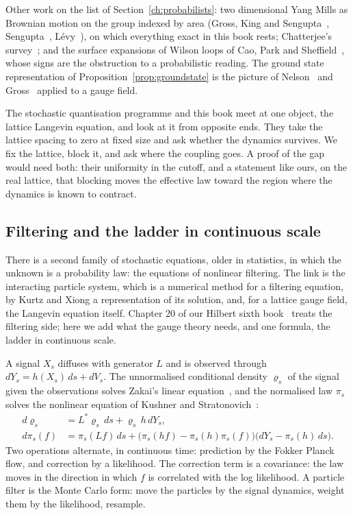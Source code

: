 Other work on the list of Section~\ref{ch:probabilists}: two dimensional Yang Mills as Brownian motion on the group indexed by area (Gross, King and Sengupta~\cite{GKS89}, Sengupta~\cite{Se97}, L\'evy~\cite{Le03}), on which everything exact in this book rests; Chatterjee's survey~\cite{Ch19}; and the surface expansions of Wilson loops of Cao, Park and Sheffield~\cite{CPS25}, whose signs are the obstruction to a probabilistic reading. The ground state representation of Proposition~\ref{prop:groundstate} is the picture of Nelson~\cite{Ne73} and Gross~\cite{Gro75} applied to a gauge field.

The stochastic quantisation programme and this book meet at one object, the lattice Langevin equation, and look at it from opposite ends. They take the lattice spacing to zero at fixed size and ask whether the dynamics survives. We fix the lattice, block it, and ask where the coupling goes. A proof of the gap would need both: their uniformity in the cutoff, and a statement like ours, on the real lattice, that blocking moves the effective law toward the region where the dynamics is known to contract.

\subsection{Filtering and the ladder in continuous scale}\label{ch:spdefilter}

There is a second family of stochastic equations, older in statistics, in which the unknown is a probability law: the equations of nonlinear filtering. The link is the interacting particle system, which is a numerical method for a filtering equation, by Kurtz and Xiong a representation of its solution, and, for a lattice gauge field, the Langevin equation itself. Chapter 20 of our Hilbert sixth book~\cite{PS26h} treats the filtering side; here we add what the gauge theory needs, and one formula, the ladder in continuous scale.

A signal $X_s$ diffuses with generator $L$ and is observed through $dY_s=h(X_s)\,ds+dV_s$. The unnormalised conditional density $\varrho_s$ of the signal given the observations solves Zakai's linear equation~\cite{Za69}, and the normalised law $\pi_s$ solves the nonlinear equation of Kushner and Stratonovich~\cite{Ku64,St60}:
\begin{align*}
d\varrho_s&=L^*\varrho_s\,ds+\varrho_s\,h\,dY_s,\\
d\pi_s(f)&=\pi_s(Lf)\,ds+\big(\pi_s(h f)-\pi_s(h)\pi_s(f)\big)\big(dY_s-\pi_s(h)\,ds\big).
\end{align*}
Two operations alternate, in continuous time: prediction by the Fokker Planck flow, and correction by a likelihood. The correction term is a covariance: the law moves in the direction in which $f$ is correlated with the log likelihood. A particle filter is the Monte Carlo form: move the particles by the signal dynamics, weight them by the likelihood, resample.

